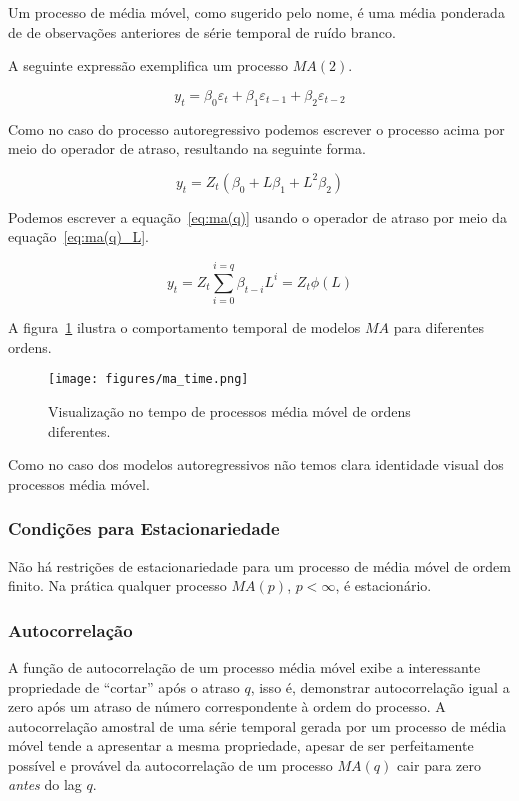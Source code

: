 Um processo de média móvel, como sugerido pelo nome, é uma média ponderada de
de observações anteriores de série temporal de ruído branco.

A seguinte expressão exemplifica um processo $MA(2)$.

$$ y_t = \beta_0 \varepsilon_t + \beta_1 \varepsilon_{t-1} + \beta_2 \varepsilon_{t-2} $$

Como no caso do processo autoregressivo podemos escrever o processo acima por
meio do operador de atraso, resultando na seguinte forma.

$$ y_t = Z_t (\beta_0 + L\beta_1 + L^2\beta_2) $$

Podemos escrever a equação~\ref{eq:ma(q)} usando o operador de atraso por meio
da equação~\ref{eq:ma(q)_L}.

\begin{equation}\label{eq:ma(q)_L}
    y_t = Z_t \sum_{i=0}^{i=q} \beta_{t-i} L^{i} = Z_t \phi(L)
\end{equation}

A figura~\ref{fig:ma_time} ilustra o comportamento temporal de modelos $MA$ para
diferentes ordens.

\begin{figure}[H]
    \centering
    \texttt{[image: figures/ma\_time.png]}
    \caption{Visualização no tempo de processos média móvel de ordens
    diferentes.}
    \label{fig:ma_time}
\end{figure}

Como no caso dos modelos autoregressivos não temos clara identidade visual dos
processos média móvel.

\subsubsection{Condições para Estacionariedade}

Não há restrições de estacionariedade para um processo de média móvel de ordem
finito. Na prática qualquer processo $MA(p)$, $p < \infty$, é estacionário.

\subsubsection{Autocorrelação}

A função de autocorrelação de um processo média móvel exibe a interessante
propriedade de ``cortar'' após o atraso $q$, isso é, demonstrar autocorrelação
igual a zero após um atraso de número correspondente à ordem do processo. A
autocorrelação amostral de uma série temporal gerada por um processo de média
móvel tende a apresentar a mesma propriedade, apesar de ser perfeitamente
possível e provável da autocorrelação de um processo $MA(q)$ cair para zero
\emph{antes} do lag $q$.

